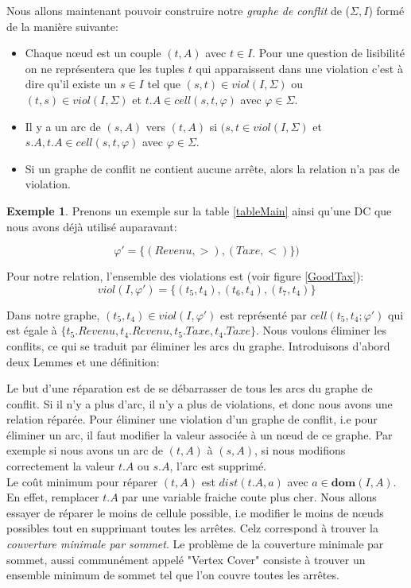 \documentclass[letterpaper, 12pt]{report}
\theoremstyle{definition}
\newtheorem{myexample}{Exemple}
\newcommand{\dom}{\mathbf{dom}}
\begin{document}
Nous allons maintenant pouvoir construire notre \emph{graphe de conflit} de ($\Sigma,I$) formé de la manière suivante:
\begin{itemize}
\item Chaque nœud est un couple $(t,A)$ avec $t\in I$. Pour une question de lisibilité on ne représentera que les tuples $t$ qui apparaissent dans une violation c'est à dire qu'il existe un $s \in I$ tel que $(s,t) \in viol(I,\Sigma)$ ou $(t,s) \in viol(I,\Sigma)$ et $t.A \in cell(s,t,\varphi)$ avec $\varphi \in \Sigma$.
\item Il y a un arc de $(s,A)$ vers $(t,A)$ si $(s,t \in viol(I,\Sigma)$ et $s.A,t.A \in cell(s,t,\varphi)$ avec $\varphi \in \Sigma$. 
\item Si un graphe de conflit ne contient aucune arrête, alors la relation n'a pas de violation.
\end{itemize}

\begin{myexample}
Prenons un exemple sur la table \ref{tableMain} ainsi qu'une DC que nous avons déjà utilisé auparavant:

$$\varphi' =\{(Revenu,>),(Taxe,<) \})$$

Pour notre relation, l'ensemble des violations est (voir figure \ref{GoodTax}):
 $$ viol(I,\varphi') = \{ (t_5,t_4),(t_6,t_4),(t_7,t_4) \}$$

Dans notre graphe, $(t_5,t_4) \in viol(I,\varphi')$ est représenté par $cell(t_5,t_4;\varphi')$ qui est égale à $\{ t_5.Revenu, t_4.Revenu, t_5.Taxe, t_4.Taxe\}$. Nous voulons éliminer les conflits, ce qui se traduit par éliminer les arcs du graphe. Introduisons d'abord deux Lemmes et une définition: \cite{main}
\end{myexample}

Le but d'une réparation est de se débarrasser de tous les arcs du graphe de conflit. Si il n'y a plus d'arc, il n'y a plus de violations, et donc nous avons une relation réparée. Pour éliminer une violation d'un graphe de conflit, i.e pour éliminer un arc, il faut modifier la valeur associée à un nœud de ce graphe. Par exemple si nous avons un arc de $(t,A)$ à $(s,A)$, si nous modifions correctement la valeur $t.A$ ou $s.A$, l'arc est supprimé.\\

Le coût minimum pour réparer $(t,A)$ est $dist(t.A,a)$ avec $a \in \dom(I,A)$. En effet, remplacer $t.A$ par une variable fraiche coute plus cher. Nous allons essayer de réparer le moins de cellule possible, i.e modifier le moins de nœuds possibles tout en supprimant toutes les arrêtes. Celz correspond à trouver la \emph{couverture minimale par sommet}. Le problème de la couverture minimale par sommet, aussi communément appelé "Vertex Cover" consiste à trouver un ensemble minimum de sommet tel que l'on couvre toutes les arrêtes.
\end{document}
